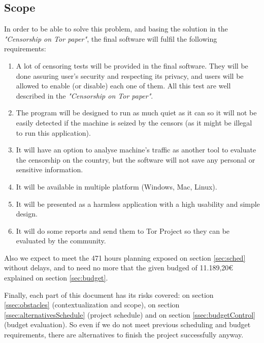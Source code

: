 \subsection{Scope}
\label{ssec:scope}
In order to be able to solve this problem, and basing the solution in the \textit{"Censorship on Tor paper"}, the final software will fulfil the following requirements:
\begin{enumerate}
\item A lot of censoring tests will be provided in the final software. They will be done assuring user's security and respecting its privacy, and users will be allowed to enable (or disable) each one of them. All this test are well described in the \textit{"Censorship on Tor paper"}.
\item The program will be designed to run as much quiet as it can so it will not be easily detected if the machine is seized by the censors (as it might be illegal to run this application).
\item It will have an option to analyse machine's traffic as another tool to evaluate the censorship on the country, but the software will not save any personal or sensitive information.
\item It will be available in multiple platform (Windows, Mac, Linux).
\item It will be presented as a harmless application with a high usability and simple design.
\item It will do some reports and send them to Tor Project so they can be evaluated by the community.
\end{enumerate}

Also we expect to meet the 471 hours planning exposed on section \ref{sec:sched} without delays, and to need no more that the given budged of 11.189,20€ explained on section \ref{sec:budget}.

Finally, each part of this document has its risks covered: on section \ref{ssec:obstacles} (contextualization and scope), on section \ref{ssec:alternativesSchedule} (project schedule) and on section \ref{ssec:budgetControl} (budget evaluation). So even if we do not meet previous scheduling and budget requirements, there are alternatives to finish the project successfully anyway.